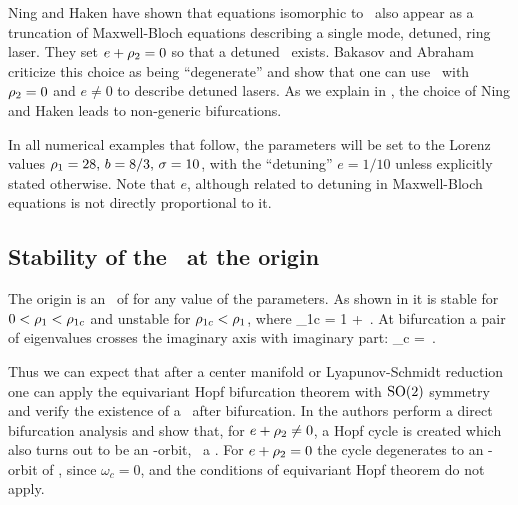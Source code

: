 \eeq
Ning and Haken have shown
that equations isomorphic to \CLe\ also appear as a
truncation of Maxwell-Bloch equations describing a single
mode, detuned, ring laser.
They set $e+\rho_2=0$ so that a detuned
\eqv\ exists.
Bakasov and Abraham criticize this
choice as being ``degenerate'' and show that one can use
\CLe\ with $\rho_2=0$ and $e \neq 0$ to describe detuned lasers.
As we explain in , the choice of Ning and
Haken leads to non-generic bifurcations.

In all numerical examples
that follow, the parameters will be set to the Lorenz values
$\rho_1=28,\, b=8/3,\, \sigma=10$, with the ``detuning'' $e=1/10$ unless explicitly
stated otherwise. Note that $e$, although related to detuning in Maxwell-Bloch equations
is not directly proportional to it.




\subsection{Stability of the \eqv\ at the origin}
\label{sec:Eqv0}

The origin  is an \eqv\ of  for any
value of the parameters. As shown in  it
is stable for $0<\rho_1<\rho_{1c}$ and unstable for
$\rho_{1c}<\rho_1$, where
\beq
	\rho_{1c} = 1 + \,.
\eeq
At bifurcation a pair of eigenvalues crosses the imaginary axis with imaginary part:
\beq
	\omega_c = \,.
	\label{eq:omegaCLE}
\eeq

Thus we can expect that after a center manifold or Lyapunov-Schmidt reduction one
can apply the equivariant Hopf bifurcation theorem with $\textrm{SO}(2)$ symmetry
and verify the existence of a \reqv\ after bifurcation. In  the authors perform a direct bifurcation analysis and
show that, for $e+\rho_2\neq 0$, a Hopf cycle  is created which also turns out to be an -orbit,
\ie\ a \reqv. For $e+\rho_2=0$ the cycle degenerates to an -orbit of \eqva,
since $\omega_c =0$, and the conditions of equivariant Hopf theorem do not apply.

